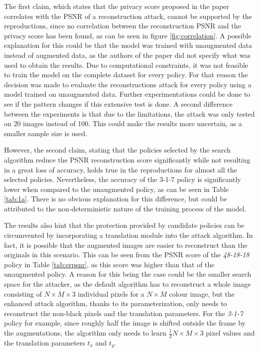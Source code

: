 The first claim, which states that the privacy score proposed in the paper correlates with the PSNR of a reconstruction attack, cannot be supported by the reproductions, since no correlation between the reconstruction PSNR and the privacy score has been found, as can be seen in figure \ref{fig:correlation}. A possible explanation for this could be that the model was trained with unaugmented data instead of augmented data, as the authors of the paper did not specify what was used to obtain the results. Due to computational constraints, it was not feasible to train the model on the complete dataset for every policy. For that reason the decision was made to evaluate the reconstructions attack for every policy using a model trained on unaugmented data. Further experimentations could be done to see if the pattern changes if this extensive test is done. A second difference between the experiments is that due to the limitations, the attack was only tested on 20 images instead of 100. This could make the results more uncertain, as a smaller sample size is used.

However, the second claim, stating that the policies selected by the search algorithm reduce the PSNR reconstruction score significantly while not resulting in a great loss of accuracy, holds true in the reproductions for almost all the selected policies. Nevertheless, the accuracy of the 3-1-7 policy is significantly lower when compared to the unaugmented policy, as can be seen in Table \ref{tab:1a}. There is no obvious explanation for this difference, but could be attributed to the non-deterministic nature of the training process of the model.

The results also hint that the protection provided by candidate policies can be circumvented by incorporating a translation module into the attack algorithm. In fact, it is possible that the augmented images are easier to reconstruct than the originals in this scenario. This can be seen from the PSNR score of the \textit{48-18-18} policy in Table \ref{tab:erpsnr}, as this score was higher than that of the unaugmented policy. A reason for this being the case could be the smaller search space for the attacker,
as the default algorithm has to reconstruct a whole image consisting of $N\times M\times 3$ individual pixels for a $N \times M$ colour image, but the enhanced attack algorithm, thanks to its parameterization, only needs to reconstruct the non-black pixels and the translation parameters. For the \textit{3-1-7} policy for example, since roughly half the image is shifted outside the frame by the augmentations,
the algorithm only needs to learn $\frac12 N\times M \times 3$ pixel values and the translation parameters $t_x$ and $t_y$.

